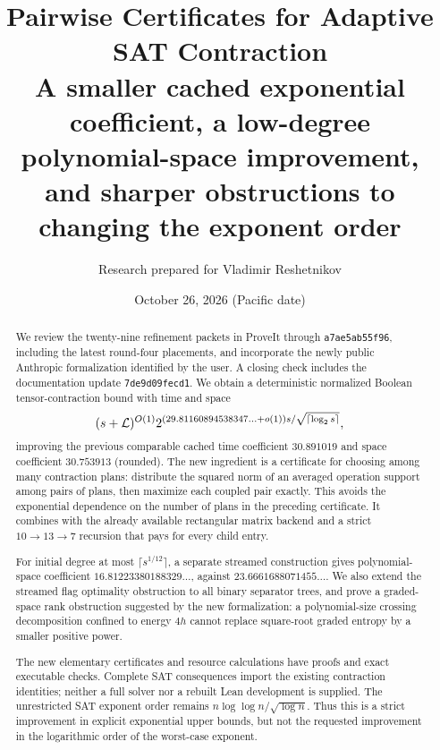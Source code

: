 \documentclass[11pt,letterpaper]{article}
\title{Pairwise Certificates for Adaptive SAT Contraction\\[5pt]
\large A smaller cached exponential coefficient, a low-degree polynomial-space improvement, and sharper obstructions to changing the exponent order}
\author{Research prepared for Vladimir Reshetnikov}
\date{October 26, 2026 (Pacific date)}
\theoremstyle{definition}\newtheorem{definition}[theorem]{Definition}
\theoremstyle{remark}\newtheorem{remark}[theorem]{Remark}
\newcommand{\pin}{\texttt{a7ae5ab55f96}}
\begin{document}
\maketitle
\begin{abstract}
We review the twenty-nine refinement packets in ProveIt through \pin,
including the latest round-four placements, and incorporate the newly public
Anthropic formalization identified by the user. A closing check includes
the documentation update \texttt{7de9d09fecd1}. We obtain a deterministic
normalized Boolean tensor-contraction bound with time and space
\[
 (s+\mathcal L)^{O(1)}
 2^{(29.81160894538347\ldots+o(1))s/\sqrt{\lceil\log_2s\rceil}},
\]
improving the previous comparable cached time coefficient $30.891019$
and space coefficient $30.753913$ (rounded).
The new ingredient is a certificate for choosing among many contraction
plans: distribute the squared norm of an averaged operation support among
pairs of plans, then maximize each coupled pair exactly. This avoids the
exponential dependence on the number of plans in the preceding certificate.
It combines with the already available rectangular matrix backend and a
strict $10\to13\to7$ recursion that pays for every child entry.

For initial degree at most $\lceil s^{1/12}\rceil$, a separate streamed
construction gives polynomial-space coefficient $16.81223380188329\ldots$,
against $23.6661688071455\ldots$. We also extend the streamed flag
optimality obstruction to all binary separator trees, and prove a
graded-space rank obstruction suggested by the new formalization: a
polynomial-size crossing decomposition confined to energy $4h$ cannot
replace square-root graded entropy by a smaller positive power.

The new elementary certificates and resource calculations have proofs and
exact executable checks. Complete SAT consequences import the existing
contraction identities; neither a full solver nor a rebuilt Lean development
is supplied. The unrestricted SAT exponent order remains
$n\log\log n/\sqrt{\log n}$. Thus this is a strict improvement in explicit
exponential upper bounds, but not the requested improvement in the
logarithmic order of the worst-case exponent.
\end{abstract}
\newpage\setcounter{tocdepth}{1}\tableofcontents\newpage










\end{document}
